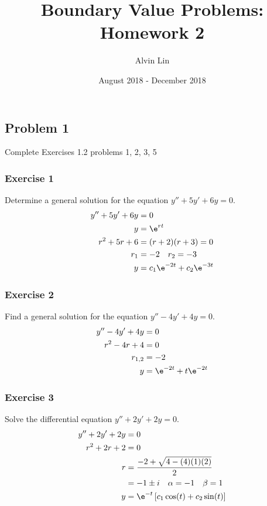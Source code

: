 \documentclass{math}
\title{Boundary Value Problems: Homework 2}
\author{Alvin Lin}
\date{August 2018 - December 2018}
\begin{document}
\maketitle

\subsection*{Problem 1}
Complete Exercises 1.2 problems 1, 2, 3, 5 \\

\subsubsection*{Exercise 1}
Determine a general solution for the equation \( y''+5y'+6y = 0 \).
\begin{align*}
  y''+5y'+6y &= 0 \\
  y &= \e^{rt} \\
  r^2+5r+6 &= (r+2)(r+3) = 0 \\
  r_1 &= -2 \quad r_2 = -3 \\
  y &= c_1\e^{-2t}+c_2\e^{-3t}
\end{align*}

\subsubsection*{Exercise 2}
Find a general solution for the equation \( y''-4y'+4y = 0 \).
\begin{align*}
  y''-4y'+4y &= 0 \\
  r^2-4r+4 &= 0 \\
  r_{1,2} &= -2 \\
  y &= \e^{-2t}+t\e^{-2t}
\end{align*}

\subsubsection*{Exercise 3}
Solve the differential equation \( y''+2y'+2y = 0 \).
\begin{align*}
  y''+2y'+2y &= 0 \\
  r^2+2r+2 &= 0 \\
  r &= \frac{-2+\sqrt{4-(4)(1)(2)}}{2} \\
  &= -1\pm i \quad \alpha = -1 \quad \beta = 1 \\
  y &= \e^{-t}\left[c_1\cos(t)+c_2\sin(t)\right]
\end{align*}
\end{document}
